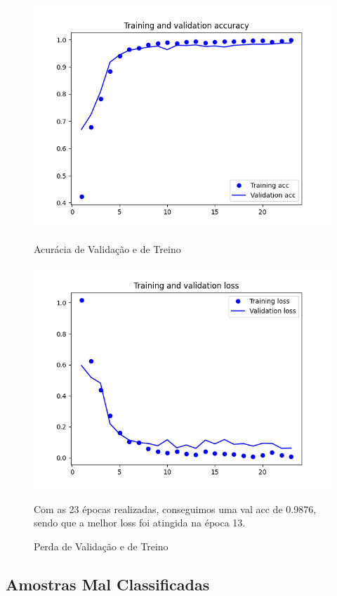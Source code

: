 \begin{figure}[H]
    \centering
    \includegraphics[width=\textwidth]{imgs/Test_9/train_test_acc.png}
    \caption{Acurácia de Validação e de Treino}
    \includegraphics[width=\textwidth]{imgs/Test_9/train_test_loss.png}
    \caption{Perda de Validação e de Treino}
    \label{fig:sub2}
    Com as 23 épocas realizadas, conseguimos uma val acc de 0.9876, sendo que a melhor loss foi atingida na época 13.
\end{figure}

\subsection{Amostras Mal Classificadas}

